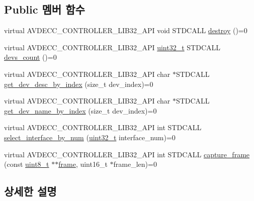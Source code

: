 \subsection*{Public 멤버 함수}
\begin{DoxyCompactItemize}
\item 
virtual A\+V\+D\+E\+C\+C\+\_\+\+C\+O\+N\+T\+R\+O\+L\+L\+E\+R\+\_\+\+L\+I\+B32\+\_\+\+A\+PI void S\+T\+D\+C\+A\+LL \hyperlink{classavdecc__lib_1_1net__interface_a3fb39895d6d015a25c95b846a3f9bdc0}{destroy} ()=0
\item 
virtual A\+V\+D\+E\+C\+C\+\_\+\+C\+O\+N\+T\+R\+O\+L\+L\+E\+R\+\_\+\+L\+I\+B32\+\_\+\+A\+PI \hyperlink{parse_8c_a6eb1e68cc391dd753bc8ce896dbb8315}{uint32\+\_\+t} S\+T\+D\+C\+A\+LL \hyperlink{classavdecc__lib_1_1net__interface_a5d4804edfb7410ac85d4f5ef345a60c4}{devs\+\_\+count} ()=0
\item 
virtual A\+V\+D\+E\+C\+C\+\_\+\+C\+O\+N\+T\+R\+O\+L\+L\+E\+R\+\_\+\+L\+I\+B32\+\_\+\+A\+PI char $\ast$S\+T\+D\+C\+A\+LL \hyperlink{classavdecc__lib_1_1net__interface_a773d7087cc950938a8f410d2e2b19271}{get\+\_\+dev\+\_\+desc\+\_\+by\+\_\+index} (size\+\_\+t dev\+\_\+index)=0
\item 
virtual A\+V\+D\+E\+C\+C\+\_\+\+C\+O\+N\+T\+R\+O\+L\+L\+E\+R\+\_\+\+L\+I\+B32\+\_\+\+A\+PI char $\ast$S\+T\+D\+C\+A\+LL \hyperlink{classavdecc__lib_1_1net__interface_a7330c8623cd405815ac472c6e9d91279}{get\+\_\+dev\+\_\+name\+\_\+by\+\_\+index} (size\+\_\+t dev\+\_\+index)=0
\item 
virtual A\+V\+D\+E\+C\+C\+\_\+\+C\+O\+N\+T\+R\+O\+L\+L\+E\+R\+\_\+\+L\+I\+B32\+\_\+\+A\+PI int S\+T\+D\+C\+A\+LL \hyperlink{classavdecc__lib_1_1net__interface_aa7536ea7fbe280f30268a53d39ced695}{select\+\_\+interface\+\_\+by\+\_\+num} (\hyperlink{parse_8c_a6eb1e68cc391dd753bc8ce896dbb8315}{uint32\+\_\+t} interface\+\_\+num)=0
\item 
virtual A\+V\+D\+E\+C\+C\+\_\+\+C\+O\+N\+T\+R\+O\+L\+L\+E\+R\+\_\+\+L\+I\+B32\+\_\+\+A\+PI int S\+T\+D\+C\+A\+LL \hyperlink{classavdecc__lib_1_1net__interface_abc4b8e72ca342282d346c379f9f3fc89}{capture\+\_\+frame} (const \hyperlink{stdint_8h_aba7bc1797add20fe3efdf37ced1182c5}{uint8\+\_\+t} $\ast$$\ast$\hyperlink{gst__avb__playbin_8c_ac8e710e0b5e994c0545d75d69868c6f0}{frame}, uint16\+\_\+t $\ast$frame\+\_\+len)=0
\end{DoxyCompactItemize}


\subsection{상세한 설명}


